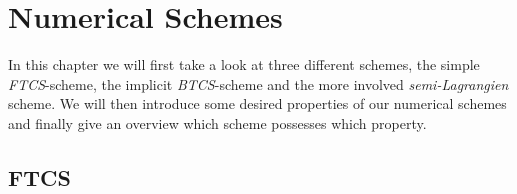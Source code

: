 \section{Numerical Schemes}
In this chapter we will first take a look at three different schemes, the simple \textit{FTCS}-scheme, the implicit \textit{BTCS}-scheme and the more involved \textit{semi-Lagrangien} scheme. We will then introduce some desired properties of our numerical schemes and finally give an overview which scheme possesses which property.
\subsection{FTCS}
